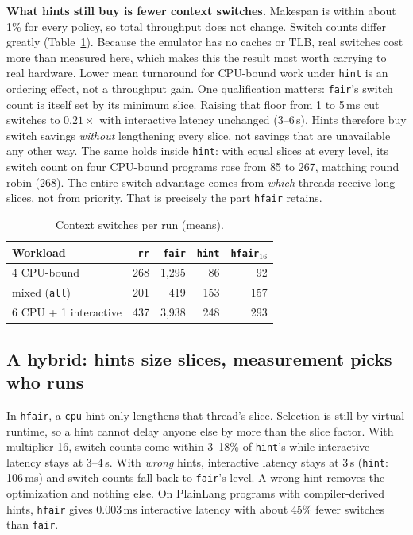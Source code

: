 \documentclass[10pt,twocolumn]{article}
\newcommand{\us}{\,\textmu s}
\newcommand{\ms}{\,ms}
\newcommand{\pol}[1]{\texttt{#1}}
\newcommand{\finding}[1]{\textbf{#1}}
\begin{document}
\finding{What hints still buy is fewer context switches.} Makespan is within about 1\% for
every policy, so total throughput does not change. Switch counts differ greatly
(Table~\ref{tab:switches}). Because the emulator has no caches or TLB, real switches cost
more than measured here, which makes this the result most worth carrying to real hardware.
Lower mean turnaround for CPU-bound work under \pol{hint} is an ordering effect, not a
throughput gain. One qualification matters: \pol{fair}'s switch count is itself set by its
minimum slice. Raising that floor from 1 to 5\ms{} cut switches to $0.21\times$ with
interactive latency unchanged (3--6\us). Hints therefore buy switch savings \emph{without}
lengthening every slice, not savings that are unavailable any other way.
The same holds inside \pol{hint}: with equal slices at every level, its switch count on
four CPU-bound programs rose from 85 to 267, matching round robin (268). The entire
switch advantage comes from \emph{which} threads receive long slices, not from priority.
That is precisely the part \pol{hfair} retains.

\begin{table}[t]
\centering\small
\begin{tabular}{@{}lrrrr@{}}
\toprule
Workload & \pol{rr} & \pol{fair} & \pol{hint} & \pol{hfair}$_{16}$ \\ \midrule
4 CPU-bound & 268 & 1{,}295 & 86 & 92 \\
mixed (\texttt{all}) & 201 & 419 & 153 & 157 \\
6 CPU + 1 interactive & 437 & 3{,}938 & 248 & 293 \\ \bottomrule
\end{tabular}
\caption{Context switches per run (means).}\label{tab:switches}
\end{table}

\subsection{A hybrid: hints size slices, measurement picks who runs}
In \pol{hfair}, a \texttt{cpu} hint only lengthens that thread's slice. Selection is still
by virtual runtime, so a hint cannot delay anyone else by more than the slice factor. With
multiplier 16, switch counts come within 3--18\% of \pol{hint}'s while interactive latency
stays at 3--4\us. With \emph{wrong} hints, interactive latency stays at 3\us{} (\pol{hint}:
106\ms) and switch counts fall back to \pol{fair}'s level. A wrong hint removes the
optimization and nothing else. On PlainLang programs with compiler-derived hints,
\pol{hfair} gives 0.003\ms{} interactive latency with about 45\% fewer switches than
\pol{fair}.
\end{document}
